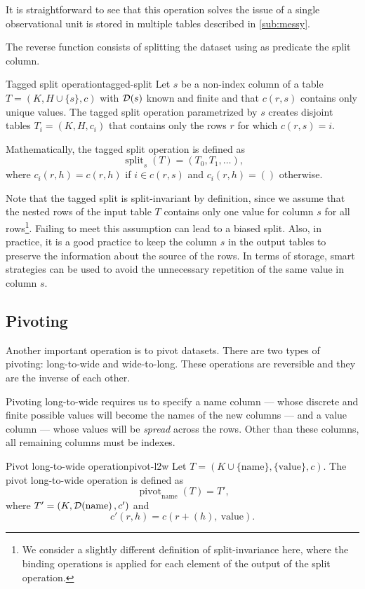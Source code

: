 It is straightforward to see that this operation solves the issue of a single
observational unit is stored in multiple tables described in \cref{sub:messy}.

The reverse function consists of splitting the dataset using as predicate the split column.

\begin{defbox}{Tagged split operation}{tagged-split}
  Let $s$ be a non-index column of a table $T = (K, H \cup \{s\}, c)$ with $\mathcal{D}\!\left(s\right)$
  known and finite and that $c(r, s)$ contains only unique values. The tagged split
  operation parametrized by $s$ creates disjoint tables $T_i = (K, H, c_i)$ that contains
  only the rows $r$ for which $c(r, s) = i$.

  Mathematically, the tagged split operation is defined as \[
    \operatorname{split}_{s}(T) = \left(T_0, T_1, \dots\right)\text{,}
  \] where $c_i(r, h) = c(r, h)$ if $i \in c(r, s)$ and $c_i(r, h) = ()$ otherwise.
\end{defbox}

Note that the tagged split is split-invariant by definition, since we assume that the
nested rows of the input table $T$ contains only one value for column $s$ for all
rows\footnote{We consider a slightly different definition of split-invariance here, where
the binding operations is applied for each element of the output of the split operation.}.
Failing to meet this assumption can lead to a biased split.  Also, in practice, it is a
good practice to keep the column $s$ in the output tables to preserve the information
about the source of the rows.  In terms of storage, smart strategies can be used to
avoid the unnecessary repetition of the same value in column $s$.

\subsection{Pivoting}

Another important operation is to pivot datasets.  There are two types of pivoting:
long-to-wide and wide-to-long.  These operations are reversible  and they are the inverse
of each other.

Pivoting long-to-wide requires us to specify a name column --- whose discrete and finite
possible values will become the names of the new columns --- and a value column --- whose
values will be \emph{spread} across the rows.  Other than these columns, all remaining columns
must be indexes.

\begin{defbox}{Pivot long-to-wide operation}{pivot-l2w}
  Let $T = (K \cup \{\text{name}\}, \{\text{value}\}, c)$. The pivot long-to-wide
  operation is defined as \[
    \operatorname{pivot}_\text{name}(T) = T'\text{,}
  \] where $T' = (K, \mathcal{D}\!\left(\text{name}\right), c')$ and \[
    c'(r, h) = c\left(r + (h),~\text{value}\right)\text{.}
  \]
\end{defbox}

